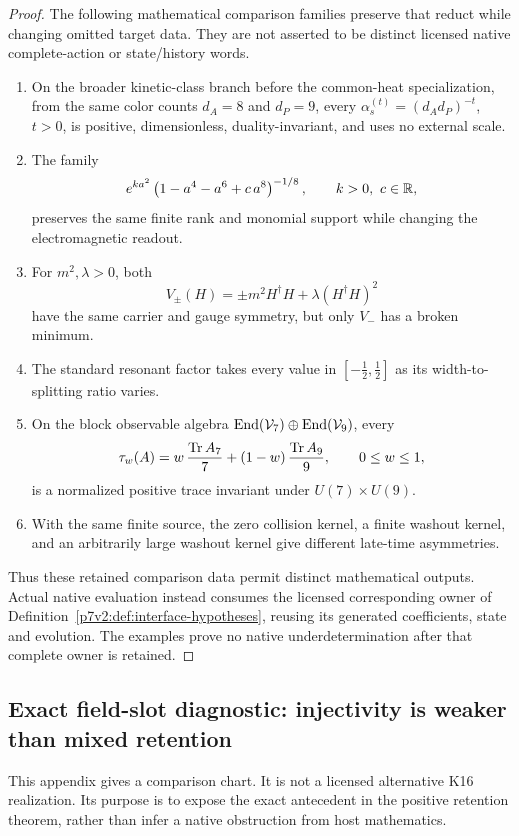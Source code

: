 \documentclass[11pt,a4paper]{article}
\begin{document}
\begin{proof}
The following mathematical comparison families preserve that reduct while
changing omitted target data.  They are not asserted to be distinct licensed
native complete-action or state/history words.
\begin{enumerate}[label=(\alph*),leftmargin=2.5em]
  \item On the broader kinetic-class branch before the common-heat
  specialization, from the same color counts \(d_A=8\) and \(d_P=9\), every
  \(\alpha_s^{(t)}=(d_Ad_P)^{-t}\), \(t>0\), is positive,
  dimensionless, duality-invariant, and uses no external scale.
  \item The family
  \[
    e^{k a^2}
    \left(1-a^4-a^6+c\,a^8\right)^{-1/8},
    \qquad k>0,\ c\in\mathbb{R},
  \]
  preserves the same finite rank and monomial support while changing the
  electromagnetic readout.
  \item For \(m^2,\lambda>0\), both
  \[
    V_\pm(H)=\pm m^2H^\dagger H+\lambda(H^\dagger H)^2
  \]
  have the same carrier and gauge symmetry, but only \(V_-\) has a broken
  minimum.
  \item The standard resonant factor takes every value in
  \([-\tfrac12,\tfrac12]\) as its width-to-splitting ratio varies.
  \item On the block observable algebra
  \(\operatorname{End}(\mathcal V_7)\oplus\operatorname{End}(\mathcal V_9)\), every
  \[
    \tau_w(A)
    =
    w\,\frac{\operatorname{Tr} A_7}{7}
    +(1-w)\,\frac{\operatorname{Tr} A_9}{9},
    \qquad 0\leq w\leq1,
  \]
  is a normalized positive trace invariant under
  \(U(7)\times U(9)\).
  \item With the same finite source, the zero collision kernel, a finite
  washout kernel, and an arbitrarily large washout kernel give different
  late-time asymmetries.
\end{enumerate}
Thus these retained comparison data permit distinct mathematical outputs.
Actual native evaluation instead consumes the licensed corresponding owner
of Definition~\ref{p7v2:def:interface-hypotheses}, reusing its generated
coefficients, state and evolution.  The examples prove no native
underdetermination after that complete owner is retained.
\end{proof}


\subsection{Exact field-slot diagnostic: injectivity is weaker than mixed retention}
\label{p5c:v2171:app:fieldslot}
This appendix gives a comparison chart. It is not a licensed alternative
K16 realization. Its purpose is to expose the exact antecedent in the positive
retention theorem, rather than infer a native obstruction from host mathematics.
\end{document}
